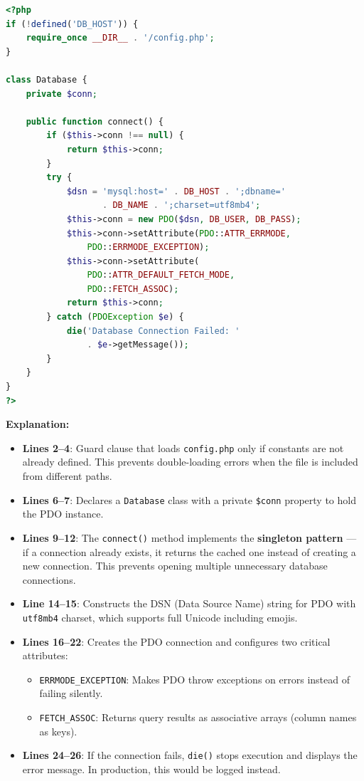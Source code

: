 \documentclass[12pt,a4paper]{report}
\begin{document}
\begin{lstlisting}[language=PHP]
<?php
if (!defined('DB_HOST')) {
    require_once __DIR__ . '/config.php';
}

class Database {
    private $conn;

    public function connect() {
        if ($this->conn !== null) {
            return $this->conn;
        }
        try {
            $dsn = 'mysql:host=' . DB_HOST . ';dbname='
                   . DB_NAME . ';charset=utf8mb4';
            $this->conn = new PDO($dsn, DB_USER, DB_PASS);
            $this->conn->setAttribute(PDO::ATTR_ERRMODE,
                PDO::ERRMODE_EXCEPTION);
            $this->conn->setAttribute(
                PDO::ATTR_DEFAULT_FETCH_MODE,
                PDO::FETCH_ASSOC);
            return $this->conn;
        } catch (PDOException $e) {
            die('Database Connection Failed: '
                . $e->getMessage());
        }
    }
}
?>
\end{lstlisting}

\textbf{Explanation:}
\begin{itemize}
    \item \textbf{Lines 2--4}: Guard clause that loads \texttt{config.php} only if constants are not already defined. This prevents double-loading errors when the file is included from different paths.
    \item \textbf{Lines 6--7}: Declares a \texttt{Database} class with a private \texttt{\$conn} property to hold the PDO instance.
    \item \textbf{Lines 9--12}: The \texttt{connect()} method implements the \textbf{singleton pattern} --- if a connection already exists, it returns the cached one instead of creating a new connection. This prevents opening multiple unnecessary database connections.
    \item \textbf{Line 14--15}: Constructs the DSN (Data Source Name) string for PDO with \texttt{utf8mb4} charset, which supports full Unicode including emojis.
    \item \textbf{Lines 16--22}: Creates the PDO connection and configures two critical attributes:
    \begin{itemize}
        \item \texttt{ERRMODE\_EXCEPTION}: Makes PDO throw exceptions on errors instead of failing silently.
        \item \texttt{FETCH\_ASSOC}: Returns query results as associative arrays (column names as keys).
    \end{itemize}
    \item \textbf{Lines 24--26}: If the connection fails, \texttt{die()} stops execution and displays the error message. In production, this would be logged instead.
\end{itemize}
\end{document}
